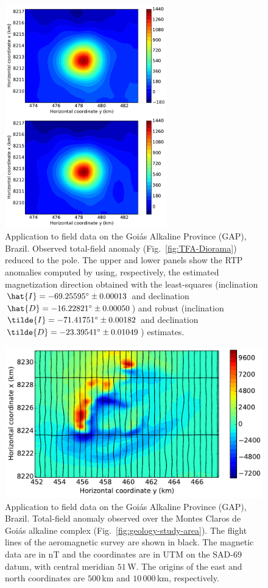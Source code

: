 \documentclass[journal abbreviation, npg]{copernicus}
\begin{document}
\begin{figure}[t]
  \includegraphics[width=70mm]{Figures/npgd-2014-0069-f10}
  \caption{Application to field data on the Goi\'{a}s Alkaline
    Province (GAP), Brazil. Observed total-field anomaly
    (Fig.~\ref{fig:TFA-Diorama}) reduced to the pole. The upper and
    lower panels show the RTP anomalies computed by using,
    respectively, the estimated magnetization direction obtained with
    the least-squares (inclination $\hat{I} = -69.25595{\degree} \pm
    0.00013${\degree} and declination $\hat{D} = -16.22821{\degree}
    \pm 0.00050${\degree}) and robust (inclination $\tilde{I} =
    -71.41751{\degree} \pm 0.00182${\degree} and declination
    $\tilde{D} = -23.39541{\degree} \pm 0.01049${\degree}) estimates.}
\label{fig:TFA-Diorama-RTP}
\end{figure}

\begin{figure}[t]
\includegraphics[width=120mm]{Figures/npgd-2014-0069-f11}
\caption{Application to field data on the Goi\'{a}s Alkaline Province
  (GAP), Brazil. Total-field anomaly observed over the Montes Claros
  de Goi\'{a}s alkaline complex
  (Fig.~\ref{fig:geology-study-area}). The flight lines of the
  aeromagnetic survey are shown in black. The magnetic data are in nT
  and the coordinates are in UTM on the SAD-69 datum, with central
  meridian $51${\degree}\,W. The origins of the east and north
  coordinates are $500$\,\unit{km} and $10\,000$\,\unit{km},
  respectively.}
\label{fig:TFA-MCG}
\end{figure}
\end{document}
